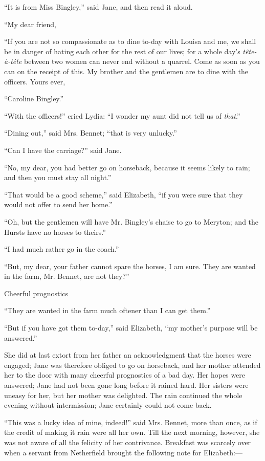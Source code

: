 \documentclass[12pt,openright]{book}
\begin{document}
“It is from Miss Bingley,” said Jane, and then read it aloud.

“My dear friend,

“If you are not so compassionate as to dine to-day with Louisa and me, we shall be in danger of hating each other for the rest of our lives; for a whole day’s \textit{tête-à-tête} between two women can never end without a quarrel. Come as soon as you can on the receipt of this. My brother and the gentlemen are to dine with the officers. Yours ever,

“Caroline Bingley.”


“With the officers!” cried Lydia: “I wonder my aunt did not tell us of \textit{that}.”

“Dining out,” said Mrs. Bennet; “that is very unlucky.”

“Can I have the carriage?” said Jane.

“No, my dear, you had better go on horseback, because it seems likely to rain; and then you must stay all night.”

“That would be a good scheme,” said Elizabeth, “if you were sure that they would not offer to send her home.”

“Oh, but the gentlemen will have Mr. Bingley’s chaise to go to Meryton; and the Hursts have no horses to theirs.”

“I had much rather go in the coach.”

“But, my dear, your father cannot spare the horses, I am sure. They are wanted in the farm, Mr. Bennet, are not they?”

Cheerful prognostics

“They are wanted in the farm much oftener than I can get them.”

“But if you have got them to-day,” said Elizabeth, “my mother’s purpose will be answered.”

She did at last extort from her father an acknowledgment that the horses were engaged; Jane was therefore obliged to go on horseback, and her mother attended her to the door with many cheerful prognostics of a bad day. Her hopes were answered; Jane had not been gone long before it rained hard. Her sisters were uneasy for her, but her mother was delighted. The rain continued the whole evening without intermission; Jane certainly could not come back.

“This was a lucky idea of mine, indeed!” said Mrs. Bennet, more than once, as if the credit of making it rain were all her own. Till the next morning, however, she was not aware of all the felicity of her contrivance. Breakfast was scarcely over when a servant from Netherfield brought the following note for Elizabeth:—
\end{document}

